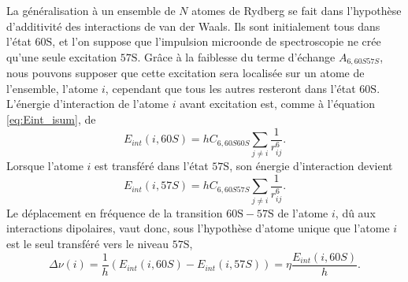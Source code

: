 La généralisation à un ensemble de $N$ atomes de Rydberg se fait dans l'hypothèse d'additivité des interactions de van der Waals.
Ils sont initialement tous dans l'état $\mathrm{60S}$, et l'on suppose que l'impulsion microonde de spectroscopie ne crée qu'une seule excitation $\mathrm{57S}$.
Grâce à la faiblesse du terme d'échange $A_{6,60S57S}$, nous pouvons supposer que cette excitation sera localisée sur un atome de l'ensemble, l'atome $i$, cependant que tous les autres resteront dans l'état $\mathrm{60S}$.
L'énergie d'interaction de l'atome $i$ avant excitation est, comme à l'équation \eqref{eq:Eint_isum}, de
\begin{equation}
\label{eq:Eint_i60S}
E_{int}(i,60S) = hC_{6,60S60S}\sum_{j\neq i} \frac{1}{r_{ij}^6}.
\end{equation}
Lorsque l'atome $i$ est transféré dans l'état $\mathrm{57S}$, son énergie d'interaction devient
\begin{equation}
\label{eq:Eint_i57S}
E_{int}(i,57S) = hC_{6,60S57S}\sum_{j\neq i} \frac{1}{r_{ij}^6}.
\end{equation}
Le déplacement en fréquence de la transition $\mathrm{60S-57S}$ de l'atome $i$, dû aux interactions dipolaires, vaut donc, sous l'hypothèse \og d'atome unique \fg{} que l'atome $i$ est le seul transféré vers le niveau $\mathrm{57S}$,
\begin{equation}
\label{eq:DeltaNu_i}
\Delta\nu (i) = \frac{1}{h}(E_{int}(i,60S)-E_{int}(i,57S)) = \eta \frac{E_{int}(i,60S)}{h}.
\end{equation}

